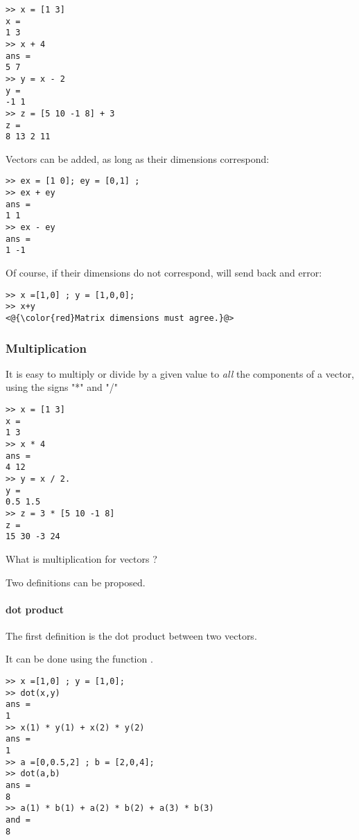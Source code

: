 \begin{lstlisting}
>> x = [1 3]
x = 
1 3
>> x + 4
ans =
5 7
>> y = x - 2
y =
-1 1
>> z = [5 10 -1 8] + 3
z = 
8 13 2 11
\end{lstlisting}


Vectors can be added, as long as their dimensions correspond:

\begin{lstlisting}
>> ex = [1 0]; ey = [0,1] ;
>> ex + ey
ans =
1 1
>> ex - ey
ans =
1 -1
\end{lstlisting}

Of course, if their dimensions do not correspond, \matlab will send back and error:

\begin{lstlisting}
>> x =[1,0] ; y = [1,0,0];
>> x+y
<@{\color{red}Matrix dimensions must agree.}@>
\end{lstlisting}







\subsubsection{Multiplication}
It is easy to multiply or divide by a given value to \emph{all} the components of a vector, using the signs "*" and "/"

\begin{lstlisting}
>> x = [1 3]
x = 
1 3
>> x * 4
ans =
4 12
>> y = x / 2.
y =
0.5 1.5
>> z = 3 * [5 10 -1 8]
z = 
15 30 -3 24
\end{lstlisting}

What is multiplication for vectors ?

Two definitions can be proposed.

\paragraph{dot product}
The first definition is the dot product between two vectors.


It can be done using the function .
\begin{lstlisting}
>> x =[1,0] ; y = [1,0];
>> dot(x,y)
ans = 
1
>> x(1) * y(1) + x(2) * y(2)
ans =
1
>> a =[0,0.5,2] ; b = [2,0,4];
>> dot(a,b)
ans = 
8
>> a(1) * b(1) + a(2) * b(2) + a(3) * b(3)    
and =
8
\end{lstlisting}


